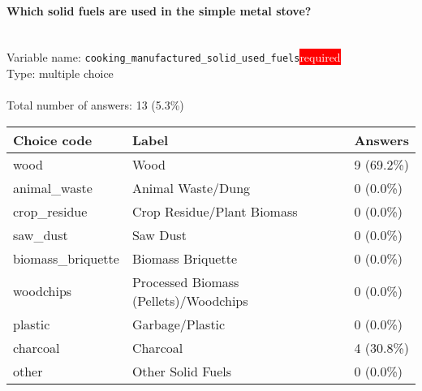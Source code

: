 \documentclass[11.5pt, a4paper]{scrartcl}
\begin{document}
\paragraph{Which solid fuels are used in the simple metal stove?}
\  \\Variable name: \texttt{cooking\_manufactured\_solid\_used\_fuels}\hfill\colorbox{red}{\small{\textcolor{white}{required}}}\\
 Type: multiple choice\\
\\Total number of answers: 13 (5.3\%)
\\[0.2em] \begin{tabular}{p{4cm}|p{8cm}|p{3cm}}
Choice code & Label & Answers \\
\hline
wood & Wood& \cellcolor{color3}9 (69.2\%)\\
\cellcolor{mygray} animal\_waste & \cellcolor{mygray}Animal Waste/Dung & \cellcolor{color0}0 (0.0\%)\\
crop\_residue & Crop Residue/Plant Biomass& \cellcolor{color0}0 (0.0\%)\\
\cellcolor{mygray} saw\_dust & \cellcolor{mygray}Saw Dust & \cellcolor{color0}0 (0.0\%)\\
biomass\_briquette & Biomass Briquette& \cellcolor{color0}0 (0.0\%)\\
\cellcolor{mygray} woodchips & \cellcolor{mygray}Processed Biomass (Pellets)/Woodchips & \cellcolor{color0}0 (0.0\%)\\
plastic & Garbage/Plastic& \cellcolor{color0}0 (0.0\%)\\
\cellcolor{mygray} charcoal & \cellcolor{mygray}Charcoal & \cellcolor{color1}4 (30.8\%)\\
other & Other Solid Fuels& \cellcolor{color0}0 (0.0\%)\\
\end{tabular}
\end{document}
